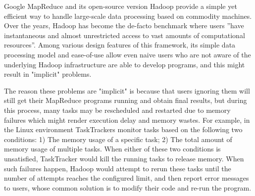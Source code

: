 Google MapReduce and its open-source version Hadoop provide a simple yet efficient way to handle large-scale data processing based on commodity machines.
Over the years, Hadoop has become the de-facto benchmark\cite{hayashibara2004varphi} where users ”have instantaneous and almost unrestricted access to vast amounts of computational resources”.
Among various design features of this framework, its simple data processing model and ease-of-use allow even naive users who are not aware of the underlying Hadoop infrastructure are able to develop programs, and this might result in "implicit" problems.
\par
The reason these problems are "implicit" is because that users ignoring them will still get their MapReduce programs running and obtain final results, but during this process, many tasks may be rescheduled and restarted due to memory failures which might render execution delay and memory wastes. 
For example, in the Linux environment TaskTrackers monitor tasks based on the following two conditions:  1) The memory usage of a specific task; 2) The total amount of memory usage of multiple tasks. When either of these two conditions is unsatisfied, TaskTracker would kill the running tasks to release memory.
When such failures happen, Hadoop would attempt to rerun these tasks until the number of attempts reaches the configured limit, and then report error messages to users, whose common solution is to modify their code and re-run the program.
\par

